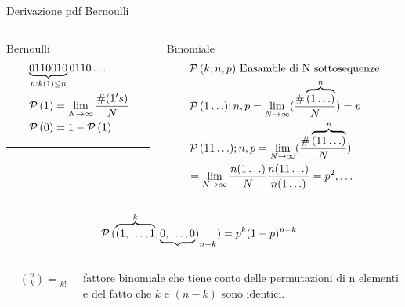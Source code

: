 \documentclass[asd-beamer.tex]{subfiles}
\begin{document}
\begin{wordonframe}{Derivazione pdf Bernoulli}
\begin{columns}[T]
\begin{column}{0.3\textwidth}
\begin{block}{Bernoulli}
\begin{align*}
&\underbrace{0110010}_{n:k(1)\leq n}0110\ldots\\
&\operatorname{\mathcal{P}}{(1)}=\lim_{N\to\infty}\frac{\#(1's)}{N}\\
&\operatorname{\mathcal{P}}{(0)}=1-\operatorname{\mathcal{P}}{(1)}\\
\end{align*}
\noindent\rule{0.9\textwidth}{0.4pt}
\end{block}
\end{column}
\begin{column}{0.7\textwidth}
\begin{block}{Binomiale}
\begin{align*}
&\operatorname{\mathcal{P}}{(k;n,p)}\ \text{Ensamble di N sottosequenze}\\
&\operatorname{\mathcal{P}}{(1\ldots);n,p}=\lim_{N\to\infty}(\frac{\#\overbrace{(1\ldots)}^n}{N})=p\\
&\operatorname{\mathcal{P}}{(11\ldots);n,p}=\lim_{N\to\infty}(\frac{\#\overbrace{(11\ldots)}^n}{N})\\
&=\lim_{N\to\infty}\frac{n(1\ldots)}{N}\frac{n(11\ldots)}{n(1\ldots)}=p^2, \ldots
\end{align*}
\end{block}
\end{column}
\end{columns}
\begin{align*}
&\operatorname{\mathcal{P}}{(\overbrace{(1,\ldots,1}^k,\underbrace{0,\ldots,0})}_{n-k})=p^k(1-p)^{n-k}
\end{align*}
\begin{columns}[T]
\begin{column}{0.2\textwidth}
\begin{align*}
&\binom{n}{k}=\frac{n!}{k!(n-k)!}
\end{align*}
\end{column}
\begin{column}{0.8\textwidth}
fattore binomiale che tiene conto delle permutazioni di n elementi e del fatto che $k$ e $(n-k)$ sono identici.
\end{column}
\end{columns}
\end{wordonframe}
\end{document}
